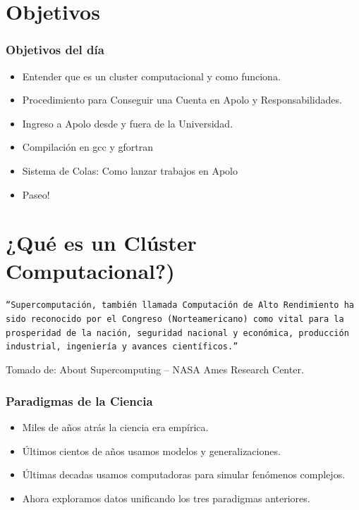 \section{Objetivos}
\begin{frame}%
  \frametitle{Objetivos del día}
  \begin{itemize}
  \item Entender que es un cluster computacional y como funciona.
  \item Procedimiento para Conseguir una Cuenta en Apolo y Responsabilidades.
  \item Ingreso a Apolo desde y fuera de la Universidad.
  \item Compilación en gcc y gfortran
  \item Sistema de Colas: Como lanzar trabajos en Apolo
  \item Paseo!
  \end{itemize}
\end{frame}

\section{¿Qué es un Clúster Computacional?)}

\begin{frame}
  \texttt{``Supercomputación, también llamada Computación de Alto Rendimiento ha sido reconocido por el Congreso (Norteamericano) como vital para la prosperidad de la nación, seguridad nacional y económica, producción industrial, ingeniería y avances científicos.''}
  \begin{flushright}
    \small{Tomado de: About Supercomputing -- NASA Ames Research Center.}
  \end{flushright}
\end{frame}

\begin{frame}
  \frametitle{Paradigmas de la Ciencia}
  \begin{itemize}
  \item Miles de años atrás la ciencia era empírica.
  \item Últimos cientos de años usamos modelos y generalizaciones.
  \item Últimas decadas usamos computadoras para simular fenómenos complejos.
  \item Ahora exploramos datos unificando los tres paradigmas anteriores. 
  \end{itemize}
\end{frame}

